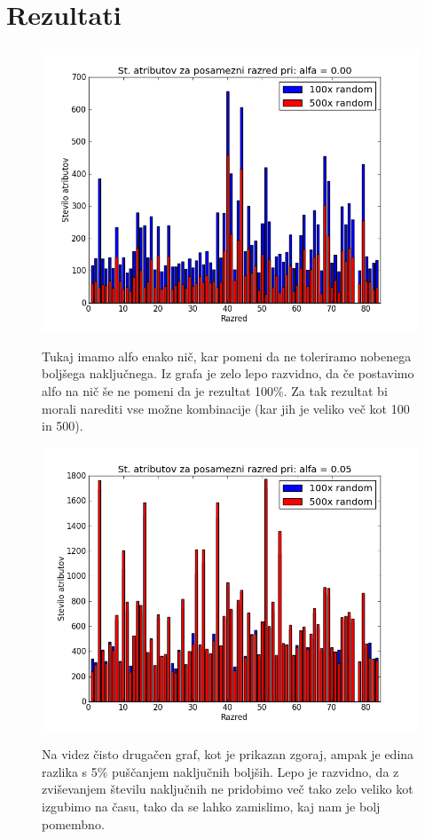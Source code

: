 \documentclass[a4paper,11pt]{article}
\begin{document}
\section{Rezultati}
\begin{figure}[h!]
\begin{center}
\includegraphics[scale=0.4]{1.png}
\end{center}
Tukaj imamo alfo enako nič, kar pomeni da ne toleriramo nobenega boljšega naključnega. Iz grafa je zelo lepo razvidno, da če postavimo alfo na nič še ne pomeni da je rezultat 100\%. Za tak rezultat bi morali narediti vse možne kombinacije (kar jih je veliko več kot 100 in 500).
\begin{center}
\includegraphics[scale=0.3]{2.png}
\end{center}
Na videz čisto drugačen graf, kot je prikazan zgoraj, ampak je edina razlika s 5\% puščanjem naključnih boljših. Lepo je razvidno, da z zviševanjem številu naključnih ne pridobimo več tako zelo veliko kot izgubimo na času, tako da se lahko zamislimo, kaj nam je bolj pomembno.
\end{figure}
\end{document}
